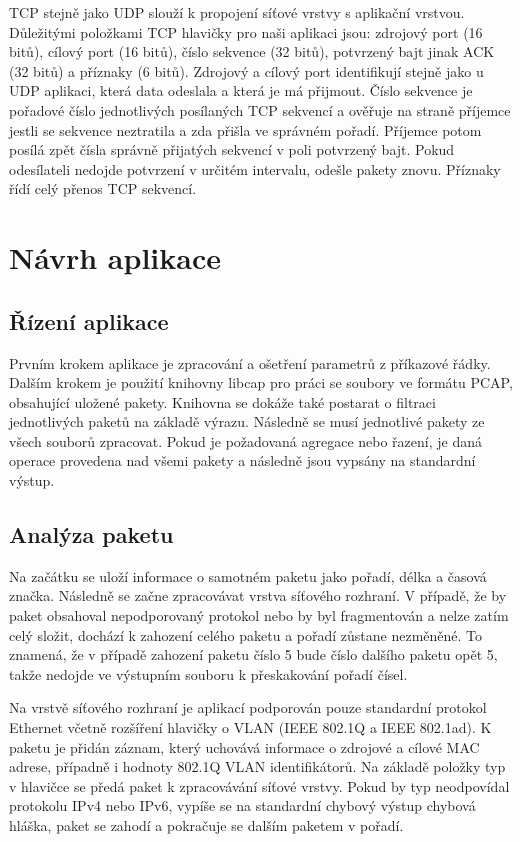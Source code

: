 \documentclass[11pt, a4paper]{article}
\begin{document}
TCP stejně jako UDP slouží k propojení síťové vrstvy s aplikační vrstvou. 
Důležitými položkami TCP hlavičky pro naši aplikaci jsou: zdrojový port (16 bitů), cílový port (16 bitů), číslo sekvence (32 bitů), potvrzený bajt jinak ACK (32 bitů) a příznaky (6 bitů).
Zdrojový a cílový port identifikují stejně jako u UDP aplikaci, která data odeslala a která je má přijmout.
Číslo sekvence je pořadové číslo jednotlivých posílaných TCP sekvencí a ověřuje na straně příjemce jestli se sekvence neztratila a zda přišla ve správném pořadí.
Příjemce potom posílá zpět čísla správně přijatých sekvencí v poli potvrzený bajt.
Pokud odesílateli nedojde potvrzení v určitém intervalu, odešle pakety znovu.
Příznaky řídí celý přenos TCP sekvencí.

\section{Návrh aplikace}

\subsection{Řízení aplikace}

Prvním krokem aplikace je zpracování a ošetření parametrů z příkazové řádky. 
Dalším krokem je použití knihovny libcap pro práci se soubory ve formátu PCAP, obsahující uložené pakety. 
Knihovna se dokáže také postarat o filtraci jednotlivých paketů na základě výrazu. 
Následně se musí jednotlivé pakety ze všech souborů zpracovat. 
Pokud je požadovaná agregace nebo řazení, je daná operace provedena nad všemi pakety a následně jsou vypsány na standardní výstup.

\subsection{Analýza paketu}

Na začátku se uloží informace o samotném paketu jako pořadí, délka a časová značka. 
Následně se začne zpracovávat vrstva síťového rozhraní. 
V případě, že by paket obsahoval nepodporovaný protokol nebo by byl fragmentován a nelze zatím celý složit, dochází k zahození celého paketu a pořadí zůstane nezměněné. 
To znamená, že v případě zahození paketu číslo 5 bude číslo dalšího paketu opět 5, takže nedojde ve výstupním souboru k přeskakování pořadí čísel.

Na vrstvě síťového rozhraní je aplikací podporován pouze standardní protokol Ethernet včetně rozšíření hlavičky o VLAN (IEEE 802.1Q a IEEE 802.1ad). 
K paketu je přidán záznam, který uchovává informace o zdrojové a cílové MAC adrese, případně i hodnoty 802.1Q VLAN identifikátorů. 
Na základě položky typ v hlavičce se předá paket k zpracovávání síťové vrstvy. 
Pokud by typ neodpovídal protokolu IPv4 nebo IPv6, vypíše se na standardní chybový výstup chybová hláška, paket se zahodí a pokračuje se dalším paketem v pořadí.
\end{document}

